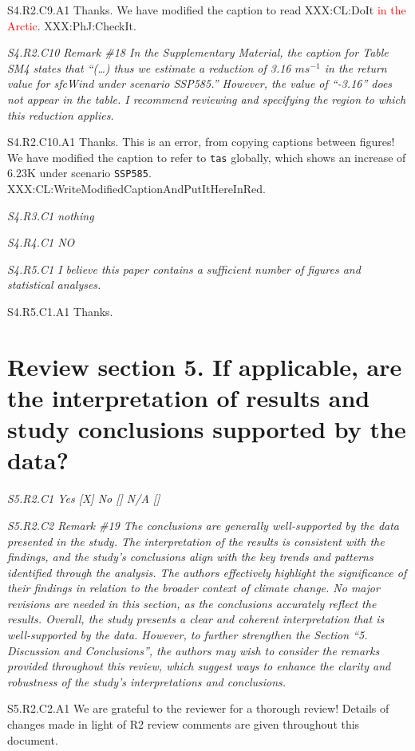 \documentclass[a4paper,10pt]{article}
\newcommand{\ed}[1]{\textcolor{red}{#1}}
\providecommand{\TA}{\texttt{tas}\xspace}
\providecommand{\SH}{\texttt{SSP585}\xspace}
\begin{document}
	S4.R2.C9.A1 Thanks. We have modified the caption to read XXX:CL:DoIt \ed{in the Arctic}. XXX:PhJ:CheckIt.

	\emph{S4.R2.C10 Remark \#18 In the Supplementary Material, the caption for Table SM4 states that “(…) thus we estimate a reduction of 3.16 $ms^{-1}$ in the return value for sfcWind under scenario SSP585.” However, the value of “-3.16” does not appear in the table. I recommend reviewing and specifying the region to which this reduction applies.}

	S4.R2.C10.A1 Thanks. This is an error, from copying captions between figures! We have modified the caption to refer to \TA globally, which shows an increase of 6.23K under scenario \SH. XXX:CL:WriteModifiedCaptionAndPutItHereInRed.

	\emph{S4.R3.C1 nothing}

	\emph{S4.R4.C1 NO}

	\emph{S4.R5.C1 I believe this paper contains a sufficient number of figures and statistical analyses.}
	
	S4.R5.C1.A1 Thanks.

	\section*{Review section 5. If applicable, are the interpretation of results and study conclusions supported by the data?}

	\emph{S5.R2.C1 Yes [X] No [] N/A []}

	\emph{S5.R2.C2 Remark \#19 The conclusions are generally well-supported by the data presented in the study. The interpretation of the results is consistent with the findings, and the study’s conclusions align with the key trends and patterns identified through the analysis. The authors effectively highlight the significance of their findings in relation to the broader context of climate change. No major revisions are needed in this section, as the conclusions accurately reflect the results. Overall, the study presents a clear and coherent interpretation that is well-supported by the data. However, to further strengthen the Section “5. Discussion and Conclusions”, the authors may wish to consider the remarks provided throughout this review, which suggest ways to enhance the clarity and robustness of the study’s interpretations and conclusions.}

	S5.R2.C2.A1 We are grateful to the reviewer for a thorough review! Details of changes made in light of R2 review comments are given throughout this document.
\end{document}
